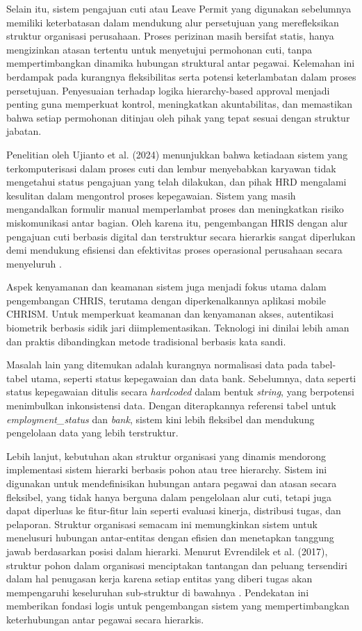Selain itu, sistem pengajuan cuti atau Leave Permit yang digunakan sebelumnya memiliki keterbatasan dalam mendukung alur persetujuan yang merefleksikan struktur organisasi perusahaan. Proses perizinan masih bersifat statis, hanya mengizinkan atasan tertentu untuk menyetujui permohonan cuti, tanpa mempertimbangkan dinamika hubungan struktural antar pegawai. Kelemahan ini berdampak pada kurangnya fleksibilitas serta potensi keterlambatan dalam proses persetujuan. Penyesuaian terhadap logika hierarchy-based approval menjadi penting guna memperkuat kontrol, meningkatkan akuntabilitas, dan memastikan bahwa setiap permohonan ditinjau oleh pihak yang tepat sesuai dengan struktur jabatan.

Penelitian oleh Ujianto et al. (2024) menunjukkan bahwa ketiadaan sistem yang terkomputerisasi dalam proses cuti dan lembur menyebabkan karyawan tidak mengetahui status pengajuan yang telah dilakukan, dan pihak HRD mengalami kesulitan dalam mengontrol proses kepegawaian. Sistem yang masih mengandalkan formulir manual memperlambat proses dan meningkatkan risiko miskomunikasi antar bagian. Oleh karena itu, pengembangan HRIS dengan alur pengajuan cuti berbasis digital dan terstruktur secara hierarkis sangat diperlukan demi mendukung efisiensi dan efektivitas proses operasional perusahaan secara menyeluruh \cite{ujianto2024human}.

Aspek kenyamanan dan keamanan sistem juga menjadi fokus utama dalam pengembangan CHRIS\@, terutama dengan diperkenalkannya aplikasi mobile CHRISM\@. Untuk memperkuat keamanan dan kenyamanan akses, autentikasi biometrik berbasis sidik jari diimplementasikan. Teknologi ini dinilai lebih aman dan praktis dibandingkan metode tradisional berbasis kata sandi.

Masalah lain yang ditemukan adalah kurangnya normalisasi data pada tabel-tabel utama, seperti status kepegawaian dan data bank. Sebelumnya, data seperti status kepegawaian ditulis secara \textit{hardcoded} dalam bentuk \textit{string}, yang berpotensi menimbulkan inkonsistensi data. Dengan diterapkannya referensi tabel untuk \textit{employment\_status} dan \textit{bank}, sistem kini lebih fleksibel dan mendukung pengelolaan data yang lebih terstruktur.

Lebih lanjut, kebutuhan akan struktur organisasi yang dinamis mendorong implementasi sistem hierarki berbasis pohon atau tree hierarchy. Sistem ini digunakan untuk mendefinisikan hubungan antara pegawai dan atasan secara fleksibel, yang tidak hanya berguna dalam pengelolaan alur cuti, tetapi juga dapat diperluas ke fitur-fitur lain seperti evaluasi kinerja, distribusi tugas, dan pelaporan. Struktur organisasi semacam ini memungkinkan sistem untuk menelusuri hubungan antar-entitas dengan efisien dan menetapkan tanggung jawab berdasarkan posisi dalam hierarki. Menurut Evrendilek et al. (2017), struktur pohon dalam organisasi menciptakan tantangan dan peluang tersendiri dalam hal penugasan kerja karena setiap entitas yang diberi tugas akan mempengaruhi keseluruhan sub-struktur di bawahnya \cite{evrendilek2017task}. Pendekatan ini memberikan fondasi logis untuk pengembangan sistem yang mempertimbangkan keterhubungan antar pegawai secara hierarkis.


